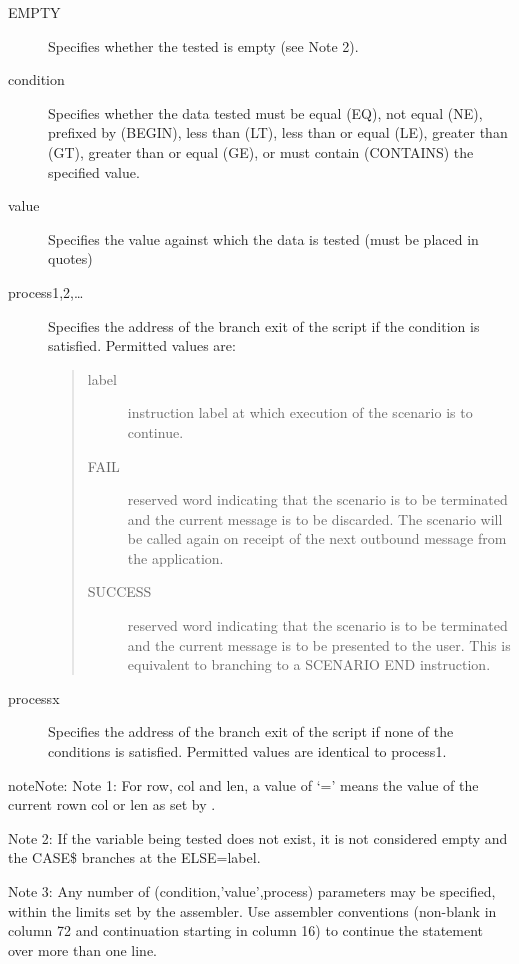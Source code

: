 \documentclass[letterpaper,10pt,english]{sphinxmanual}
\begin{document}
\begin{description}
\begin{quote}
\begin{description}
\end{description}
\end{quote}

\item[{EMPTY}] \leavevmode
Specifies whether the tested is empty (see Note 2).

\item[{condition}] \leavevmode
Specifies whether the data tested must be equal (EQ), not equal (NE), prefixed by (BEGIN), less than (LT), less than or equal (LE), greater than (GT), greater than or equal (GE), or must contain (CONTAINS) the specified value.

\item[{value}] \leavevmode
Specifies the value against which the data is tested (must be placed in quotes)

\item[{process1,2,…}] \leavevmode
Specifies the address of the branch exit of the script if the condition is satisfied. Permitted values are:
\begin{quote}
\begin{description}
\item[{label}] \leavevmode
instruction label at which execution of the scenario is to continue.

\item[{FAIL}] \leavevmode
reserved word indicating that the scenario is to be terminated and the current message is to be discarded. The scenario will be called again on receipt of the next outbound message from the application.

\item[{SUCCESS}] \leavevmode
reserved word indicating that the scenario is to be terminated and the current message is to be presented to the user. This is equivalent to branching to a SCENARIO END instruction.

\end{description}
\end{quote}

\item[{processx}] \leavevmode
Specifies the address of the branch exit of the script if none of the conditions is satisfied. Permitted values are identical to process1.

\end{description}

\begin{sphinxadmonition}{note}{Note:}
Note 1: For row, col and len, a value of ‘=’ means the value of the current rown col or len as set by {\hyperref[\detokenize{User_Guide:v457ug-set-screen-position}]{}}.

Note 2: If the variable being tested does not exist, it is not considered empty and the CASE\$ branches at the ELSE=label.

Note 3: Any number of (condition,’value’,process) parameters may be specified, within the limits set by the assembler. Use assembler conventions (non-blank in column 72 and continuation starting in column 16) to continue the statement over more than one line.
\end{sphinxadmonition}
\end{document}
